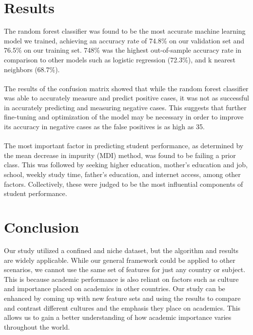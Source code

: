 \documentclass[twoside,twocolumn]{article}
\begin{document}

\section{Results}
The random forest classifier was found to be the most accurate machine learning model we trained, achieving an accuracy rate of 74.8\% on our validation set and 76.5\% on our training set. 748\% was the highest out-of-sample accuracy rate in comparison to other models such as logistic regression (72.3\%), and k nearest neighbors (68.7\%).
\\ \\
The results of the confusion matrix showed that while the random forest classifier was able to accurately measure and predict positive cases, it was not as successful in accurately predicting and measuring negative cases. This suggests that further fine-tuning and optimization of the model may be necessary in order to improve its accuracy in negative cases as the false positives is as high as 35.
\\ \\
The most important factor in predicting student performance, as determined by the mean decrease in impurity (MDI) method, was found to be failing a prior class. This was followed by seeking higher education, mother's education and job, school, weekly study time, father's education, and internet access, among other factors. Collectively, these were judged to be the most influential components of student performance.


\section{Conclusion}
Our study utilized a confined and niche dataset, but the algorithm and results are widely applicable. While our general framework could be applied to other scenarios, we cannot use the same set of features for just any country or subject. This is because academic performance is also reliant on factors such as culture and importance placed on academics in other countries. Our study can be enhanced by coming up with new feature sets and using the results to compare and contrast different cultures and the emphasis they place on academics. This allows us to gain a better understanding of how academic importance varies throughout the world.

\end{document}
